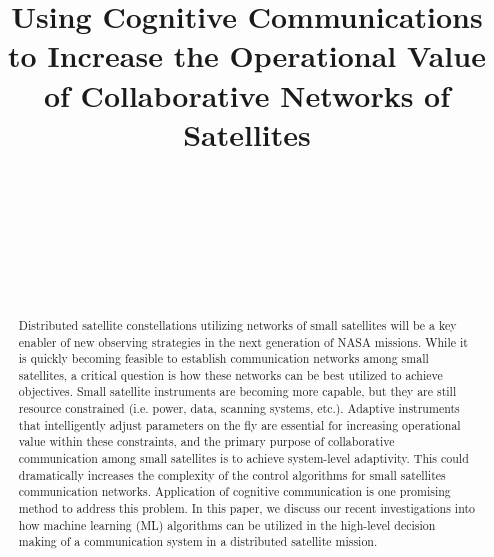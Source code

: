 \documentclass[conference]{IEEEtran}
\title{Using Cognitive Communications to Increase the Operational Value of
  Collaborative Networks of Satellites}
\author{
  \IEEEauthorblockN{Ryan B. Linnabary}
  \IEEEauthorblockA{\thisplace linnabary.24@osu.edu}
  \and
  \IEEEauthorblockN{Andrew J. O'Brien}
  \IEEEauthorblockA{\thisplace obrien.200@osu.edu}
  \and
  \IEEEauthorblockN{Graeme E. Smith}
  \IEEEauthorblockA{\thisplace smith.8347@osu.edu}
  \and
  \IEEEauthorblockN{Christopher Ball}
  \IEEEauthorblockA{\thisplace ball.51@osu.edu}
  \and {~} \and {~~~~~~~~~~~~~~~~~~~~~~~~~~~} \and
  \IEEEauthorblockN{Joel T. Johnson}
  \IEEEauthorblockA{\thisplace johnson.1374@osu.edu}
  \and {~~~~~~~~~~~~~~~~~~~~~~~} \and {~~~~~~~~~~~~~~~~~~~~~~}
}
\begin{document}
\maketitle



\begin{abstract}

  Distributed satellite constellations utilizing networks of small satellites will be a key enabler of new observing strategies in the next generation of NASA missions.  While it is quickly becoming feasible to establish communication networks among small satellites, a critical question is how these networks can be best utilized to achieve objectives.  Small satellite instruments are becoming more capable, but they are still resource constrained (i.e. power, data, scanning systems, etc.).  Adaptive instruments that intelligently adjust parameters {\color{black} on the fly} are essential for increasing operational value within these constraints, and the primary purpose of collaborative communication among small satellites is to achieve system-level adaptivity.  This could dramatically increases the complexity of the control algorithms for small satellites communication networks.  
% 
Application of cognitive communication is one promising method to address this problem.  In this paper, we discuss our recent investigations into how machine learning (ML) algorithms can be utilized in the high-level decision making of a communication system in a distributed satellite mission.  

\end{abstract}
\end{document}
